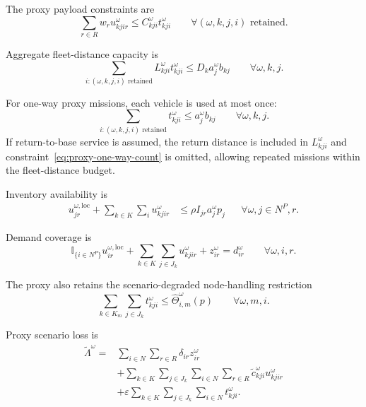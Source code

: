 \documentclass[11pt]{article}
\newcommand{\ind}{\mathbb{I}}
\begin{document}
The proxy payload constraints are
\begin{equation}
\sum_{r\in R}w_r u^\omega_{kjir}
\leq
C^\omega_{kji}t^\omega_{kji}
\qquad\forall(\omega,k,j,i)\text{ retained}.
\label{eq:proxy-payload}
\end{equation}

Aggregate fleet-distance capacity is
\begin{equation}
\sum_{i:(\omega,k,j,i)\text{ retained}}
L^\omega_{kji}t^\omega_{kji}
\leq
D_k a^\omega_j b_{kj}
\qquad\forall\omega,k,j.
\label{eq:proxy-distance}
\end{equation}

For one-way proxy missions, each vehicle is used at most once:
\begin{equation}
\sum_{i:(\omega,k,j,i)\text{ retained}}
t^\omega_{kji}
\leq
a^\omega_j b_{kj}
\qquad\forall\omega,k,j.
\label{eq:proxy-one-way-count}
\end{equation}
If return-to-base service is assumed, the return distance is included in
$L^\omega_{kji}$ and constraint~\eqref{eq:proxy-one-way-count} is omitted,
allowing repeated missions within the fleet-distance budget.

Inventory availability is
\begin{align}
u^{\omega,\mathrm{loc}}_{jr}
+\sum_{k\in K}\sum_i u^\omega_{kjir}
&\leq
\rho I_{jr}a^\omega_jp_j
&&\forall\omega,j\in N^P,r.
\label{eq:proxy-inventory}
\end{align}

Demand coverage is
\begin{equation}
\ind_{\{i\in N^P\}}u^{\omega,\mathrm{loc}}_{ir}
+\sum_{k\in K}\sum_{j\in J_k}u^\omega_{kjir}
+z^\omega_{ir}
=d^\omega_{ir}
\qquad\forall\omega,i,r.
\label{eq:proxy-demand}
\end{equation}

The proxy also retains the scenario-degraded node-handling restriction
\begin{equation}
\sum_{k\in K_m}\sum_{j\in J_k}t^\omega_{kji}
\leq
\widehat\Theta^\omega_{i,m}(p)
\qquad\forall\omega,m,i.
\label{eq:proxy-handling}
\end{equation}

Proxy scenario loss is
\begin{align}
\widetilde\Lambda^\omega
=
&\sum_{i\in N}\sum_{r\in R}\delta_{ir}z^\omega_{ir}
\nonumber\\
&+\sum_{k\in K}\sum_{j\in J_k}\sum_{i\in N}\sum_{r\in R}
\widetilde c^\omega_{kji}u^\omega_{kjir}
\nonumber\\
&+\varepsilon\sum_{k\in K}\sum_{j\in J_k}\sum_{i\in N}
t^\omega_{kji}.
\label{eq:proxy-loss}
\end{align}
\end{document}
